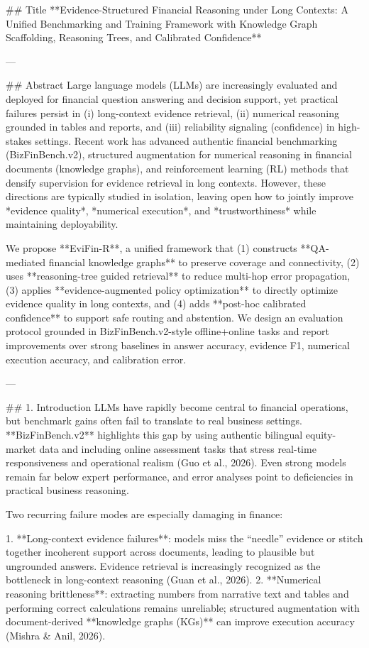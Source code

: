 ## Title  
**Evidence-Structured Financial Reasoning under Long Contexts: A Unified Benchmarking and Training Framework with Knowledge Graph Scaffolding, Reasoning Trees, and Calibrated Confidence**

---

## Abstract  
Large language models (LLMs) are increasingly evaluated and deployed for financial question answering and decision support, yet practical failures persist in (i) long-context evidence retrieval, (ii) numerical reasoning grounded in tables and reports, and (iii) reliability signaling (confidence) in high-stakes settings. Recent work has advanced authentic financial benchmarking (BizFinBench.v2), structured augmentation for numerical reasoning in financial documents (knowledge graphs), and reinforcement learning (RL) methods that densify supervision for evidence retrieval in long contexts. However, these directions are typically studied in isolation, leaving open how to jointly improve *evidence quality*, *numerical execution*, and *trustworthiness* while maintaining deployability.  

We propose **EviFin-R**, a unified framework that (1) constructs **QA-mediated financial knowledge graphs** to preserve coverage and connectivity, (2) uses **reasoning-tree guided retrieval** to reduce multi-hop error propagation, (3) applies **evidence-augmented policy optimization** to directly optimize evidence quality in long contexts, and (4) adds **post-hoc calibrated confidence** to support safe routing and abstention. We design an evaluation protocol grounded in BizFinBench.v2-style offline+online tasks and report improvements over strong baselines in answer accuracy, evidence F1, numerical execution accuracy, and calibration error.  

---

## 1. Introduction  
LLMs have rapidly become central to financial operations, but benchmark gains often fail to translate to real business settings. **BizFinBench.v2** highlights this gap by using authentic bilingual equity-market data and including online assessment tasks that stress real-time responsiveness and operational realism (Guo et al., 2026). Even strong models remain far below expert performance, and error analyses point to deficiencies in practical business reasoning.

Two recurring failure modes are especially damaging in finance:

1. **Long-context evidence failures**: models miss the “needle” evidence or stitch together incoherent support across documents, leading to plausible but ungrounded answers. Evidence retrieval is increasingly recognized as the bottleneck in long-context reasoning (Guan et al., 2026).  
2. **Numerical reasoning brittleness**: extracting numbers from narrative text and tables and performing correct calculations remains unreliable; structured augmentation with document-derived **knowledge graphs (KGs)** can improve execution accuracy (Mishra & Anil, 2026).

